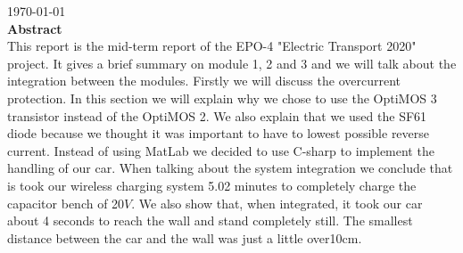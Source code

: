 \documentclass[12pt]{scrreprt}
\begin{document}
\begin{titlepage}


{\large \today}\\ [1.5cm]


 
% 

\textbf{Abstract} \\ 
This report is the mid-term report of the EPO-4 "Electric Transport 2020" project. 
It gives a brief summary on module 1, 2 and 3 and we will talk about the integration between the modules.
Firstly we will discuss the overcurrent protection. 
In this section we will explain why we chose to use the OptiMOS 3 transistor instead of the OptiMOS 2. 
We also explain that we used the SF61 diode because we thought it was important to have to lowest possible reverse current. 
Instead of using MatLab we decided to use C-sharp to implement the handling of our car. 
When talking about the system integration we conclude that is took our wireless charging system 5.02 minutes to completely charge the capacitor bench of 20$V$. 
We also show that, when integrated, it took our car about 4 seconds to reach the wall and stand completely still. 
The smallest distance between the car and the wall was just a little over10cm.





\vfill %

\end{titlepage}
\end{document}
